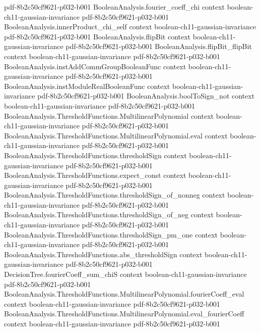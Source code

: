 \begin{lemma}
  {pdf-8b2c50cf9621-p032-b001}
\proofstep
  {BooleanAnalysis.fourier_coeff_chi}
  {context}
  {boolean-ch11-gaussian-invariance}
  {pdf-8b2c50cf9621-p032-b001}
\proofstep
  {BooleanAnalysis.innerProduct_chi_self}
  {context}
  {boolean-ch11-gaussian-invariance}
  {pdf-8b2c50cf9621-p032-b001}
\proofstep
  {BooleanAnalysis.flipBit}
  {context}
  {boolean-ch11-gaussian-invariance}
  {pdf-8b2c50cf9621-p032-b001}
\proofstep
  {BooleanAnalysis.flipBit_flipBit}
  {context}
  {boolean-ch11-gaussian-invariance}
  {pdf-8b2c50cf9621-p032-b001}
\proofstep
  {BooleanAnalysis.instAddCommGroupBooleanFunc}
  {context}
  {boolean-ch11-gaussian-invariance}
  {pdf-8b2c50cf9621-p032-b001}
\proofstep
  {BooleanAnalysis.instModuleRealBooleanFunc}
  {context}
  {boolean-ch11-gaussian-invariance}
  {pdf-8b2c50cf9621-p032-b001}
\proofstep
  {BooleanAnalysis.boolToSign_not}
  {context}
  {boolean-ch11-gaussian-invariance}
  {pdf-8b2c50cf9621-p032-b001}
\proofstep
  {BooleanAnalysis.ThresholdFunctions.MultilinearPolynomial}
  {context}
  {boolean-ch11-gaussian-invariance}
  {pdf-8b2c50cf9621-p032-b001}
\proofstep
  {BooleanAnalysis.ThresholdFunctions.MultilinearPolynomial.eval}
  {context}
  {boolean-ch11-gaussian-invariance}
  {pdf-8b2c50cf9621-p032-b001}
\proofstep
  {BooleanAnalysis.ThresholdFunctions.thresholdSign}
  {context}
  {boolean-ch11-gaussian-invariance}
  {pdf-8b2c50cf9621-p032-b001}
\proofstep
  {BooleanAnalysis.ThresholdFunctions.expect_const}
  {context}
  {boolean-ch11-gaussian-invariance}
  {pdf-8b2c50cf9621-p032-b001}
\proofstep
  {BooleanAnalysis.ThresholdFunctions.thresholdSign_of_nonneg}
  {context}
  {boolean-ch11-gaussian-invariance}
  {pdf-8b2c50cf9621-p032-b001}
\proofstep
  {BooleanAnalysis.ThresholdFunctions.thresholdSign_of_neg}
  {context}
  {boolean-ch11-gaussian-invariance}
  {pdf-8b2c50cf9621-p032-b001}
\proofstep
  {BooleanAnalysis.ThresholdFunctions.thresholdSign_pm_one}
  {context}
  {boolean-ch11-gaussian-invariance}
  {pdf-8b2c50cf9621-p032-b001}
\proofstep
  {BooleanAnalysis.ThresholdFunctions.abs_thresholdSign}
  {context}
  {boolean-ch11-gaussian-invariance}
  {pdf-8b2c50cf9621-p032-b001}
\proofstep
  {DecisionTree.fourierCoeff_sum_chiS}
  {context}
  {boolean-ch11-gaussian-invariance}
  {pdf-8b2c50cf9621-p032-b001}
\proofstep
  {BooleanAnalysis.ThresholdFunctions.MultilinearPolynomial.fourierCoeff_eval}
  {context}
  {boolean-ch11-gaussian-invariance}
  {pdf-8b2c50cf9621-p032-b001}
\proofstep
  {BooleanAnalysis.ThresholdFunctions.MultilinearPolynomial.eval_fourierCoeff}
  {context}
  {boolean-ch11-gaussian-invariance}
  {pdf-8b2c50cf9621-p032-b001}

\end{lemma}
